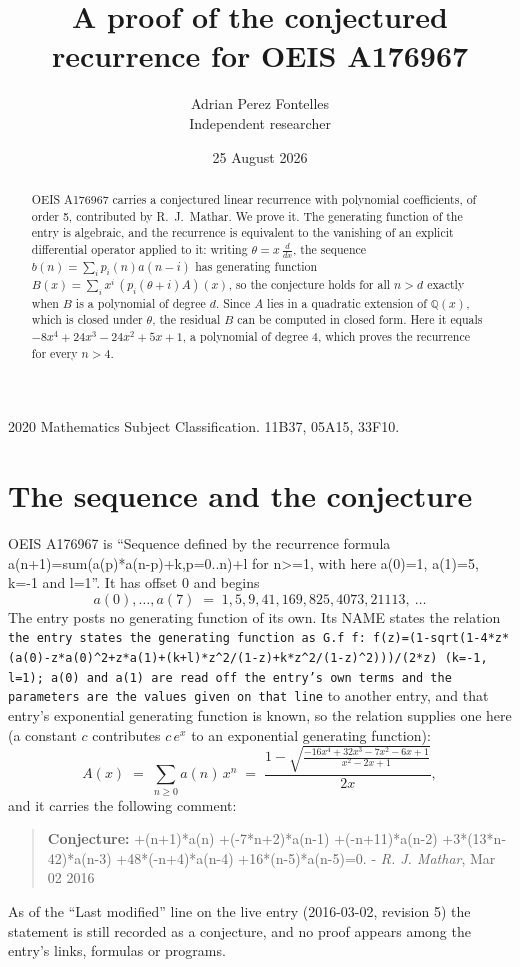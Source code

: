 \documentclass[11pt,a4paper]{article}
\title{A proof of the conjectured recurrence for OEIS A176967}
\author{Adrian Perez Fontelles\\ \small Independent researcher}
\date{25 August 2026}
\theoremstyle{plain}
\theoremstyle{definition}
\begin{document}
\maketitle

\begin{abstract}
OEIS A176967 carries a conjectured linear recurrence with polynomial coefficients, of
order 5, contributed by R.~J.~Mathar. We prove it. The generating function of the
entry is algebraic, and the recurrence is equivalent to the vanishing of an explicit
differential operator applied to it: writing $\theta=x\,\frac{d}{dx}$, the sequence
$b(n)=\sum_{i}p_{i}(n)a(n-i)$ has generating function
$B(x)=\sum_{i}x^{i}\,(p_{i}(\theta+i)A)(x)$, so the conjecture holds for all $n>d$ exactly
when $B$ is a polynomial of degree $d$. Since $A$ lies in a quadratic extension of
$\mathbb{Q}(x)$, which is closed under $\theta$, the residual $B$ can be computed in
closed form. Here it equals $- 8 x^{4} + 24 x^{3} - 24 x^{2} + 5 x + 1$, a polynomial of degree $4$, which proves
the recurrence for every $n>4$.
\end{abstract}

\noindent\small 2020 Mathematics Subject Classification. 11B37, 05A15, 33F10.\normalsize

\section{The sequence and the conjecture}

OEIS A176967 is ``Sequence defined by the recurrence formula a(n+1)=sum(a(p)*a(n-p)+k,p=0..n)+l for n>=1, with here a(0)=1, a(1)=5, k=-1 and l=1''. It has offset $0$ and begins
\[
a(0),\dots,a(7)\;=\;1, 5, 9, 41, 169, 825, 4073, 21113,\ \dots
\]
The entry posts no generating function of its own. Its NAME states the
relation \texttt{the entry states the generating function as G.f f: f(z)=(1-sqrt(1-4*z*(a(0)-z*a(0)\textasciicircum{}2+z*a(1)+(k+l)*z\textasciicircum{}2/(1-z)+k*z\textasciicircum{}2/(1-z)\textasciicircum{}2)))/(2*z) (k=-1, l=1); a(0) and a(1) are read off the entry's own terms and the parameters are the values given on that line} to another entry, and that entry's exponential generating
function is known, so the relation supplies one here (a constant $c$ contributes
$c\,e^{x}$ to an exponential generating function):
\begin{equation}\label{eq:gf}
A(x)\;=\;\sum_{n\ge 0} a(n)\,x^{n}\;=\;\frac{1 - \sqrt{\frac{- 16 x^{4} + 32 x^{3} - 7 x^{2} - 6 x + 1}{x^{2} - 2 x + 1}}}{2 x} ,
\end{equation}
and it carries the following comment:
\begin{quote}\small
\textbf{Conjecture:} +(n+1)*a(n) +(-7*n+2)*a(n-1) +(-n+11)*a(n-2) +3*(13*n-42)*a(n-3) +48*(-n+4)*a(n-4) +16*(n-5)*a(n-5)=0. - \emph{R. J. Mathar}, Mar 02 2016
\end{quote}
As of the ``Last modified'' line on the live entry (2016-03-02, revision 5) the
statement is still recorded as a conjecture, and no proof appears among the entry's links,
formulas or programs.
\end{document}
